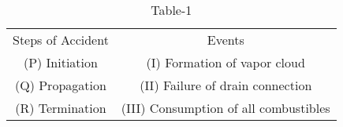 \begin{table}[H]
    \centering
    \begin{tabular}{c|c}
    Steps of Accident     &  Events \\
     (P) Initiation    &  (I)
Formation of vapor cloud\\
(Q) Propagation & (II) Failure of drain connection\\
(R) Termination & (III) Consumption of all combustibles\\
    \end{tabular}
    \caption{Table-1}
    \label{tab:tables/table1.tex}
\end{table}